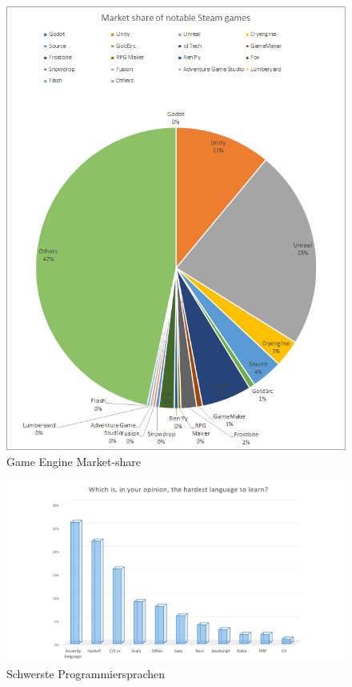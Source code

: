 \begin{figure}
    \centering
    \includegraphics[scale=0.4]{pics/game_engine_marketshare}
    \caption{Game Engine Market-share~\cite{REDDIT_2018}}
    \label{fig:game_engine_marketshare}
\end{figure}

\begin{figure}
    \includegraphics[scale=0.4]{pics/programming_languages_hardest}
    \caption{Schwerste Programmiersprachen~\cite{JAXCENTER_2018}}
    \label{fig:hardest_programming_languages}
\end{figure}


